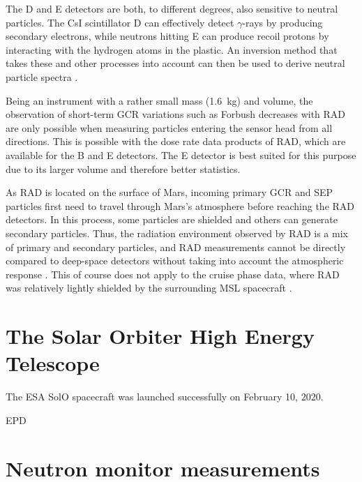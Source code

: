 The D and E detectors are both, to different degrees, also sensitive to neutral particles. The CsI scintillator D can effectively detect $\gamma$-rays by producing secondary electrons, while neutrons hitting E can produce recoil protons by interacting with the hydrogen atoms in the plastic. An inversion method that takes these and other processes into account can then be used to derive neutral particle spectra \citep{Koehler-2011}.

Being an instrument with a rather small mass (\SI{1.6}{\kilogram}) and volume, the observation of short-term \ac{GCR} variations such as Forbush decreases with \ac{RAD} are only possible when measuring particles entering the sensor head from all directions. This is possible with the dose rate data products of \ac{RAD}, which are available for the B and E detectors. The E detector is best suited for this purpose due to its larger volume and therefore better statistics.

As \ac{RAD} is located on the surface of Mars, incoming primary \ac{GCR} and \ac{SEP} particles first need to travel through Mars's atmosphere before reaching the \ac{RAD} detectors. In this process, some particles are shielded and others can generate secondary particles. Thus, the radiation environment observed by \ac{RAD} is a mix of primary and secondary particles, and \ac{RAD} measurements cannot be directly compared to deep-space detectors without taking into account the atmospheric response \citep[see e.g.][]{Guo-2017,Guo-2019}. This of course does not apply to the cruise phase data, where \ac{RAD} was relatively lightly shielded by the surrounding \ac{MSL} spacecraft \citep{Zeitlin-2013-cruise,guo2015cruise}.


\section{The Solar Orbiter High Energy Telescope}
\label{sec:solohet}

The ESA \ac{SolO} spacecraft \citep{Mueller-2020-SolO} was launched successfully on February 10, 2020.

\acl{EPD} \citep[\acs{EPD},]{RodriguezPacheco-2019-EPD}

\section{Neutron monitor measurements}
\label{sec:neutronmonitors}

